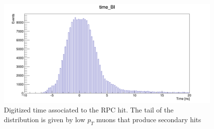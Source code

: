 \begin{figure}[!h]
	\centering
	\includegraphics[width=1\textwidth]{Chapters/CH3/figures/time_BI}
	\caption{Digitized time associated to the RPC hit. The tail of the distribution is given by low 
		$p_T$ muons that produce secondary hits}
	\label{fig:time_BI}
\end{figure}


